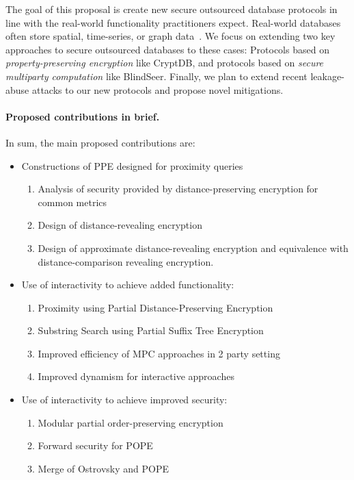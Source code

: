 The goal of this proposal is create new secure outsourced database protocols in line with the real-world functionality practitioners expect.  Real-world databases often store spatial, time-series, or graph data~\cite{SP:FVYSHG17}.  We focus on extending two key approaches to secure outsourced databases to these cases: Protocols based on \emph{property-preserving encryption} like CryptDB, and protocols based on \emph{secure multiparty computation} like BlindSeer.  Finally, we plan to extend recent leakage-abuse attacks to our new protocols and propose novel mitigations.


\paragraph*{Proposed contributions in brief.}
In sum, the main proposed contributions are:
\begin{itemize}
\item Constructions of PPE designed for proximity queries
\begin{enumerate}
\item Analysis of security provided by distance-preserving encryption for common metrics
\item Design of distance-revealing encryption
\item Design of approximate distance-revealing encryption and equivalence with distance-comparison revealing encryption.
\end{enumerate}
\item Use of interactivity to achieve added functionality:
\begin{enumerate}
\item Proximity using Partial Distance-Preserving Encryption
\item Substring Search using Partial Suffix Tree Encryption
\item Improved efficiency of MPC approaches in 2 party setting
\item Improved dynamism for interactive approaches
\end{enumerate}
\item Use of interactivity to achieve improved security:
\begin{enumerate}
\item Modular partial order-preserving encryption
\item Forward security for POPE
\item Merge of Ostrovsky and POPE
\end{enumerate}
\end{itemize}


